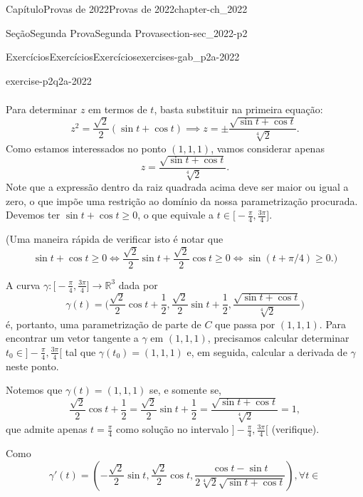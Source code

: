 \documentclass[oneside,10pt,]{book}
\numberwithin{equation}{section}
\newcommand{\R}{\mathbb R}
\begin{document}
\begin{chapterptx}{Capítulo}{Provas de 2022}{}{Provas de 2022}{}{}{chapter-ch_2022}
\begin{sectionptx}{Seção}{Segunda Prova}{}{Segunda Prova}{}{}{section-sec_2022-p2}
\begin{exercises-subsection-numberless}{Exercícios}{Exercícios}{}{Exercícios}{}{}{exercises-gab_p2a-2022}
\begin{divisionexercise}{2}{}{}{exercise-p2q2a-2022}
\begin{enumerate}[label=\alph*]
\begin{align*}
\end{align*}
Para determinar \(z\) em termos de \(t\), basta substituir na primeira equação:%
\begin{equation*}
z^2 = \dfrac{\sqrt{2}}{2}
(\sin t + \cos t) \implies z = \pm \frac{\sqrt{\sin t + \cos
t}}{\sqrt[4]{2}}.
\end{equation*}
Como estamos interessados no ponto \((1,1,1)\), vamos considerar apenas%
\begin{equation*}
z =
\frac{\sqrt{\sin t + \cos t}}{\sqrt[4]{2}}.
\end{equation*}
Note que a expressão dentro da raiz quadrada acima deve ser maior ou igual a zero, o que impõe uma restrição ao domínio da nossa parametrização procurada. Devemos ter \(\sin t + \cos t \geq
0\), o que equivale a \(t \in
\Big[-\frac{\pi}{4},\frac{3\pi}{4}\Big]\).%
\par
(Uma maneira rápida de verificar isto é notar que%
\begin{equation*}
\sin t
+ \cos t \geq 0 \iff \frac{\sqrt{2}}{2} \sin t +
\frac{\sqrt{2}}{2} \cos t \geq 0 \iff \sin(t + \pi/4) \geq
0.)
\end{equation*}
%
\par
A curva \(\gamma\colon \Big[ -\frac{\pi}{4},
\frac{3\pi}{4}\Big]\to\R^3\) dada por%
\begin{equation*}
\gamma(t) =
\Big( \frac{\sqrt{2}}{2}\cos t + \frac{1}{2},
\frac{\sqrt{2}}{2}\sin t + \frac{1}{2},\frac{\sqrt{\sin t +
\cos t}}{\sqrt[4]{2}}\Big)
\end{equation*}
é, portanto, uma parametrização de parte de \(C\) que passa por \((1,1,1)\). Para encontrar um vetor tangente a \(\gamma\) em \((1,1,1)\), precisamos calcular determinar \(t_0 \in \Big] -\frac{\pi}{4},
\frac{3\pi}{4}\Big[\) tal que \(\gamma(t_0) = (1,1,1)\) e, em seguida, calcular a derivada de \(\gamma\) neste ponto.%
\par
Notemos que \(\gamma(t) = (1,1,1)\) se, e somente se,%
\begin{equation*}
\frac{\sqrt{2}}{2}\cos t + \frac{1}{2} =
\frac{\sqrt{2}}{2}\sin t + \frac{1}{2} = \frac{\sqrt{\sin t
+ \cos t}}{\sqrt[4]{2}} = 1,
\end{equation*}
que admite apenas \(t=
\frac{\pi}{4}\) como solução no intervalo \(\Big]
-\frac{\pi}{4}, \frac{3\pi}{4}\Big[\) (verifique).%
\par
Como%
\begin{equation*}
\gamma'(t) = \left( -\frac{\sqrt{2}}{2}\sin t,
\frac{\sqrt{2}}{2}\cos t,\frac{\cos t - \sin
t}{2\sqrt[4]{2}\sqrt{\sin t + \cos t}}\right), \forall t \in

\end{equation*}
\end{enumerate}
\end{divisionexercise}
\end{exercises-subsection-numberless}
\end{sectionptx}
\end{chapterptx}
\end{document}

